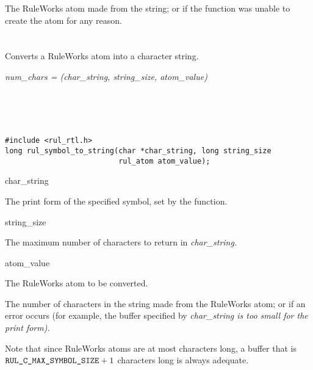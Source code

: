 \ReturnValue

The RuleWorks  atom made from the string; or
 if the function was unable to create the
atom for any reason.

\begin{seealso}


\end{seealso}

\section*{}

Converts a RuleWorks  atom into a character string.

\Syntax

\it{num\_chars} = (\it{char\_string},
\it{string\_size}, \it{atom\_value})

\begin{args}
 \\
 \\
 \\
\end{args}

\CBinding
\begin{verbatim}
#include <rul_rtl.h>
long rul_symbol_to_string(char *char_string, long string_size
                          rul_atom atom_value);
\end{verbatim}

\begin{arguments}

\item[char\_string]

The print form of the specified symbol, set by the function.

\item[string\_size]

The maximum number of characters to return in \it{char\_string}.

\item[atom\_value]

The RuleWorks atom to be converted.
\end{arguments}

\ReturnValue

The number of characters in the string made from the RuleWorks atom;
or  if an error occurs (for example, the
buffer specified by \it{char\_string} is too small for the print form).

Note that since RuleWorks atoms are at most
 characters long, a buffer that is
$\texttt{RUL\_C\_MAX\_SYMBOL\_SIZE} + 1$ characters long is always
adequate.

\begin{seealso}
\end{seealso}

